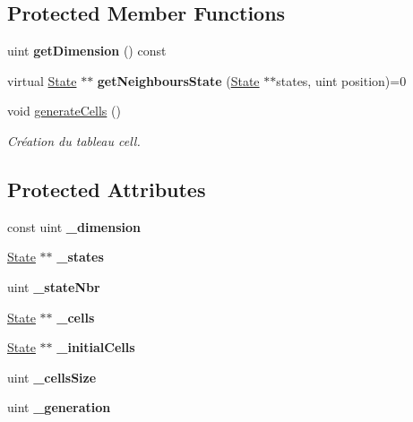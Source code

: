 \subsection*{Protected Member Functions}
\begin{DoxyCompactItemize}
\item 
\mbox{\label{class_simulator_afed2f1f48c0296409320705282ad496c}} 
uint {\bfseries get\+Dimension} () const
\item 
\mbox{\label{class_simulator_a83986de22f0f418ba26b09b25db7453f}} 
virtual \mbox{\hyperlink{class_state}{State}} $\ast$$\ast$ {\bfseries get\+Neighbours\+State} (\mbox{\hyperlink{class_state}{State}} $\ast$$\ast$states, uint position)=0
\item 
\mbox{\label{class_simulator_afc0e1c55404f13b822dc4bd827eba309}} 
void \mbox{\hyperlink{class_simulator_afc0e1c55404f13b822dc4bd827eba309}{generate\+Cells}} ()
\begin{DoxyCompactList}\small\item\em Création du tableau cell. \end{DoxyCompactList}\end{DoxyCompactItemize}
\subsection*{Protected Attributes}
\begin{DoxyCompactItemize}
\item 
\mbox{\label{class_simulator_af764ca05d1a430dc29ad72a0da4a6713}} 
const uint {\bfseries \+\_\+dimension}
\item 
\mbox{\label{class_simulator_a58498a2c12ab56bc2016c8902648d45c}} 
\mbox{\hyperlink{class_state}{State}} $\ast$$\ast$ {\bfseries \+\_\+states}
\item 
\mbox{\label{class_simulator_ae1b570c7399e44d5bfb25cd244b74239}} 
uint {\bfseries \+\_\+state\+Nbr}
\item 
\mbox{\label{class_simulator_a4d3b17ad7c7bf69ab2b3a84aca9cab37}} 
\mbox{\hyperlink{class_state}{State}} $\ast$$\ast$ {\bfseries \+\_\+cells}
\item 
\mbox{\label{class_simulator_a91d8143475fef13e59a5251c75eadc39}} 
\mbox{\hyperlink{class_state}{State}} $\ast$$\ast$ {\bfseries \+\_\+initial\+Cells}
\item 
\mbox{\label{class_simulator_a24e4794366f160f640552895306fb06c}} 
uint {\bfseries \+\_\+cells\+Size}
\item 
\mbox{\label{class_simulator_add4bfae1aed43d511c5cc4a91925cb9c}} 
uint {\bfseries \+\_\+generation}
\end{DoxyCompactItemize}


